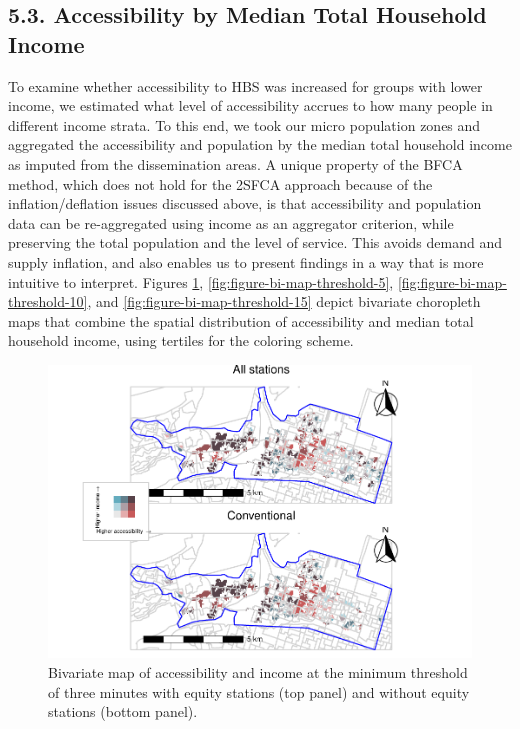 \documentclass[]{elsarticle} %
\begin{document}
\hypertarget{accessibility-by-median-total-household-income}{%
\subsection{5.3. Accessibility by Median Total Household
Income}\label{accessibility-by-median-total-household-income}}

To examine whether accessibility to HBS was increased for groups with
lower income, we estimated what level of accessibility accrues to how
many people in different income strata. To this end, we took our micro
population zones and aggregated the accessibility and population by the
median total household income as imputed from the dissemination areas. A
unique property of the BFCA method, which does not hold for the 2SFCA
approach because of the inflation/deflation issues discussed above, is
that accessibility and population data can be re-aggregated using income
as an aggregator criterion, while preserving the total population and
the level of service. This avoids demand and supply inflation, and also
enables us to present findings in a way that is more intuitive to
interpret. Figures \ref{fig:figure-bi-map-threshold-3},
\ref{fig:figure-bi-map-threshold-5},
\ref{fig:figure-bi-map-threshold-10}, and
\ref{fig:figure-bi-map-threshold-15} depict bivariate choropleth maps
that combine the spatial distribution of accessibility and median total
household income, using tertiles for the coloring scheme.

\begin{figure}
\includegraphics[width=1.2\linewidth]{Bike-share-spatial-equity_files/figure-latex/figure-bi-map-threshold-3-1} \caption{\label{fig-bivariate-map-threshold-3}Bivariate map of accessibility and income at the minimum threshold of three minutes with equity stations (top panel) and without equity stations (bottom panel).}\label{fig:figure-bi-map-threshold-3}
\end{figure}
\end{document}
